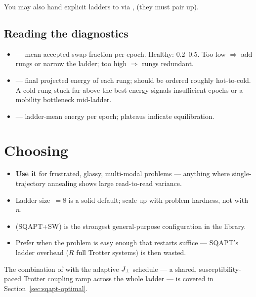 You may also hand explicit ladders to  via
,  (they must pair up).

\subsection{Reading the diagnostics}

\begin{itemize}
\item {} --- mean accepted-swap fraction per
epoch. Healthy: $0.2$--$0.5$. Too low $\Rightarrow$ add rungs or narrow the
ladder; too high $\Rightarrow$ rungs redundant.
\item {} --- final projected energy of each rung; should
be ordered roughly hot-to-cold. A cold rung stuck far above the best energy
signals insufficient epochs or a mobility bottleneck mid-ladder.
\item {} --- ladder-mean energy per epoch;
plateaus indicate equilibration.
\end{itemize}

\section{Choosing }

\begin{itemize}
\item \textbf{Use it} for frustrated, glassy, multi-modal problems ---
anything where single-trajectory annealing shows large read-to-read
variance.
\item Ladder size $\,=8$ is a solid default; scale up with
problem hardness, not with $n$.
\item {} (SQAPT+SW) is the strongest general-purpose
configuration in the library.
\item Prefer  when the problem is easy enough that restarts
suffice --- SQAPT's ladder overhead ($R$ full Trotter systems) is then wasted.
\end{itemize}

The combination of  with the adaptive $J_{\perp}$ schedule --- a
shared, susceptibility-paced Trotter coupling ramp across the whole ladder ---
is covered in Section~\ref{sec:sqapt-optimal}.

